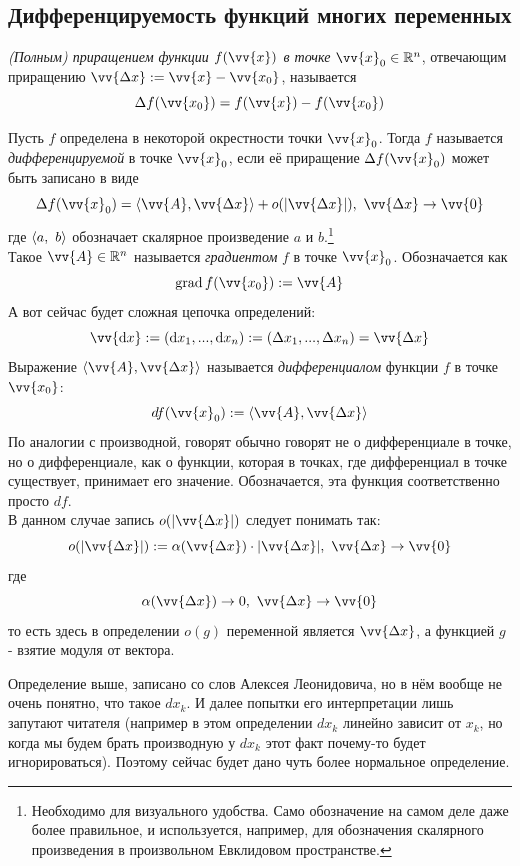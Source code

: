 \subsection{Дифференцируемость функций многих переменных}

\begin{definition}
	\textit{(Полным) приращением функции $f(\vv{x})$ в точке} $\vv{x}_0 \in \R^n$, отвечающим приращению $\vv{\Delta x} := \vv{x} - \vv{x_0}$, называется
	\[
		\Delta f(\vv{x_0}) = f(\vv{x}) - f(\vv{x_0})
	\]
\end{definition}

\begin{definition}
	Пусть $f$ определена в некоторой окрестности точки $\vv{x}_0$. Тогда $f$ называется \textit{дифференцируемой} в точке $\vv{x}_0$, если её приращение $\Delta f(\vv{x}_0)$ может быть записано в виде
	\[
		\Delta f(\vv{x}_0) = \trbr{\vv{A}, \vv{\Delta x}} + o(|\vv{\Delta x}|),\ \vv{\Delta x} \to \vv{0}
	\]
	где $\left\langle a,\ b\right\rangle$ обозначает скалярное произведение $a$ и $b$.\footnote{ Необходимо для визуального удобства. Само обозначение на самом деле даже более правильное, и используется, например, для обозначения скалярного произведения в произвольном Евклидовом пространстве.}
	\\
	Такое $\vv{A} \in \R^n$ называется \textit{градиентом} $f$ в точке $\vv{x}_0$. Обозначается как
	\[
		\grad f(\vv{x_0}) := \vv{A}
	\]
	А вот сейчас будет сложная цепочка определений:
	\[
		\vv{\mathrm{d}x}:=(\mathrm{d}x_1, ..., \mathrm{d}x_n):=(\Delta x_1, ..., \Delta x_n) = \vv{\Delta x}
	\]
	Выражение $\trbr{\vv{A}, \vv{\Delta x}}$ называется \textit{дифференциалом} функции $f$ в точке $\vv{x_0}$:
	\[
		df(\vv{x}_0) := \trbr{\vv{A}, \vv{\Delta x}}
	\]
	По аналогии с производной, говорят обычно говорят не о дифференциале в точке, но о дифференциале, как о функции, которая в точках, где дифференциал в точке существует, принимает его значение. Обозначается, эта функция соответственно просто $df$.
	\\
	В данном случае запись $o(|\vv{\Delta x}|)$ следует понимать так:
	\[
		o(|\vv{\Delta x}|):=\alpha(\vv{\Delta x})\cdot|\vv{\Delta x}|,\ \vv{\Delta x} \to \vv{0}
	\]
	где
	\[
	\alpha(\vv{\Delta x}) \to 0,\ \vv{\Delta x} \to \vv{0}
	\]
	то есть здесь в определении $o(g)$ переменной является $\vv{\Delta x}$, а функцией $g$ - взятие модуля от вектора.
\end{definition}

\begin{anote}
	 Определение выше, записано со слов Алексея Леонидовича, но в нём вообще не очень понятно, что такое $dx_k$. И далее попытки его интерпретации лишь запутают читателя (например в этом определении $dx_k$ линейно зависит от $x_k$, но когда мы  будем брать производную у $dx_k$ этот факт почему-то будет игнорироваться). Поэтому сейчас будет дано чуть более нормальное определение.
\end{anote}


